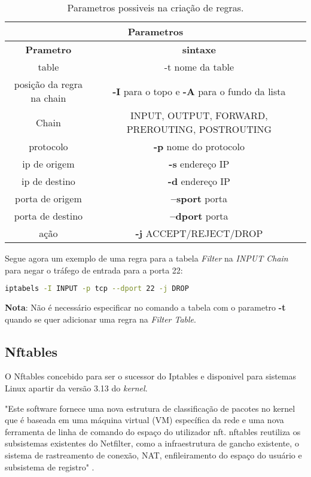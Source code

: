 \begin{table}[H]
\centering
\begin{tabular}{|c|c|}
\hline
\multicolumn{2}{|c|}{Parametros}\\
\hline
\textbf{Prametro} & \textbf{sintaxe} \\
\hline
table & -t nome da table \\
\hline
posição da regra na chain & \textbf{-I} para o topo e \textbf{-A} para o fundo da lista \\
\hline
Chain & INPUT, OUTPUT, FORWARD, PREROUTING, POSTROUTING \\
\hline
protocolo & \textbf{-p} nome do protocolo  \\
\hline
ip de origem & \textbf{-s} endereço IP  \\
\hline
ip de destino & \textbf{-d} endereço IP  \\
\hline
porta de origem & \textbf{--sport} porta  \\
\hline
porta de destino & \textbf{--dport} porta  \\
\hline
ação & \textbf{-j} ACCEPT/REJECT/DROP  \\
\hline
\end{tabular}
\caption{Parametros possiveis na criação de regras.}
\label{ipt3args}
\end{table}
    
Segue agora um exemplo de uma regra para a tabela \textit{Filter} na 
\textit{INPUT Chain} para negar o tráfego de entrada para a porta 22:

\begin{lstlisting}[language=Bash, caption={exemplo de comando}]
iptabels -I INPUT -p tcp --dport 22 -j DROP
\end{lstlisting}

\textbf{Nota}: Não é necessário especificar no comando a tabela  com o parametro
\textbf{-t} quando se quer adicionar uma regra na \textit{Filter Table}.

\subsection{Nftables}

O Nftables \cite{nftables} concebido para ser o sucessor do Iptables e disponivel para sistemas 
Linux apartir da versão 3.13 do \textit{kernel}.

"Este software fornece uma nova estrutura de classificação de pacotes no kernel 
que é baseada em uma máquina virtual (VM) específica da rede e uma nova ferramenta 
de linha de comando do espaço do utilizador nft. nftables reutiliza os subsistemas 
existentes do Netfilter, como a infraestrutura de gancho existente, o sistema de 
rastreamento de conexão, NAT, enfileiramento do espaço do usuário e subsistema de 
registro" \cite{nftables}.

